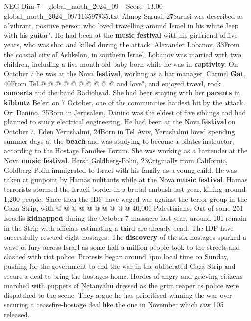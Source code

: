 \begin{textsample}{NEG Dim 7 – global\_north\_2024\_09 – Score -13.00 – global\_north\_2024\_09/113597935.txt}
Almog Sarusi, 27Sarusi was described as a"vibrant, positive person who loved travelling around Israel in his white Jeep with his guitar".
He had been at the \textbf{music} \textbf{festival} with his girlfriend of five years, who was shot and killed during the attack.
Alexander Lobanov, 33From the coastal city of Ashkelon, in southern Israel, Lobanov was married with two children, including a five-month-old baby born while he was in \textbf{captivity}.
On October 7 he was at the Nova \textbf{festival}, working as a bar manager.
Carmel \textbf{Gat}, 40From Tel @ @ @ @ @ @ @ @ @ @ and love", and enjoyed travel, rock \textbf{concerts} and the band Radiohead.
She had been staying with her \textbf{parents} in \textbf{kibbutz} Be'eri on 7 October, one of the communities hardest hit by the attack.
Ori Danino, 25Born in Jerusalem, Danino was the eldest of five siblings and had planned to study electrical engineering.
He had been at the Nova \textbf{festival} on October 7.
Eden Yerushalmi, 24Born in Tel Aviv, Yerushalmi loved spending summer days at the \textbf{beach} and was studying to become a pilates instructor, according to the Hostage Families Forum.
She was working as a bartender at the Nova \textbf{music} \textbf{festival}.
Hersh Goldberg-Polin, 23Originally from California, Goldberg-Polin immigrated to Israel with his family as a young child.
He was taken at gunpoint by Hamas militants while at the Nova \textbf{music} \textbf{festival}.
Hamas terrorists stormed the Israeli border in a brutal ambush last year, killing around 1,200 people.
Since then the IDF have waged war against the terror group in the Gaza Strip, with @ @ @ @ @ @ @ @ @ @ 40,000 Palestinians.
Out of some 251 Israelis \textbf{kidnapped} during the October 7 massacre last year, around 101 remain in the Strip with officials estimating a third are already dead.
The IDF have successfully rescued eight hostages.
The \textbf{discovery} of the six hostages sparked a wave of fury across Israel as some half a million people took to the streets and clashed with riot police.
Protests began around 7pm local time on Sunday, pushing for the government to end the war in the obliterated Gaza Strip and secure a deal to bring the hostages home.
Hordes of angry and grieving citizens marched with puppets of Netanyahu dressed as the grim reaper as police were dispatched to the scene.
They argue he has prioritised winning the war over securing a ceasefire-hostage deal like the one in November which saw 105 released.

\end{textsample}
